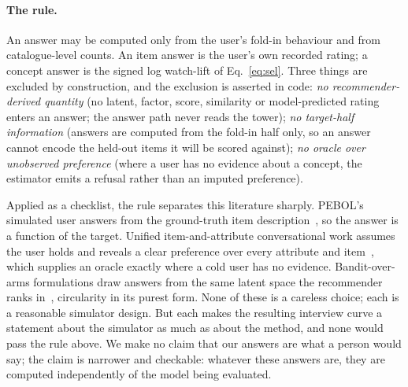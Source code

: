 \documentclass[acmsmall,review,anonymous]{acmart}
\begin{document}
\paragraph{The rule.} An answer may be computed only from the user's fold-in behaviour and from catalogue-level counts. An item answer is the user's own recorded rating; a concept answer is the signed log watch-lift of Eq.~\eqref{eq:sel}. Three things are excluded by construction, and the exclusion is asserted in code: \emph{no recommender-derived quantity} (no latent, factor, score, similarity or model-predicted rating enters an answer; the answer path never reads the tower); \emph{no target-half information} (answers are computed from the fold-in half only, so an answer cannot encode the held-out items it will be scored against); \emph{no oracle over unobserved preference} (where a user has no evidence about a concept, the estimator emits a refusal rather than an imputed preference).

Applied as a checklist, the rule separates this literature sharply. PEBOL's simulated user answers from the ground-truth item description~\citep{austin2024bayesian}, so the answer is a function of the target. Unified item-and-attribute conversational work assumes the user holds and reveals a clear preference over every attribute and item~\citep{deng2021unicorn}, which supplies an oracle exactly where a cold user has no evidence. Bandit-over-arms formulations draw answers from the same latent space the recommender ranks in~\citep{li2021seamlessly}, circularity in its purest form. None of these is a careless choice; each is a reasonable simulator design. But each makes the resulting interview curve a statement about the simulator as much as about the method, and none would pass the rule above. We make no claim that our answers are what a person would say; the claim is narrower and checkable: whatever these answers are, they are computed independently of the model being evaluated.
\end{document}
